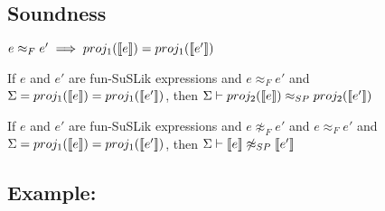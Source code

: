\documentclass[10pt]{article}
\begin{document}
%
%
%
%
%
%


\subsection{Soundness}
\label{sec:TransSoundness}


\begin{theorem}
  $e \approx_F e' \implies proj_1(\llbracket e\rrbracket) = proj_1(\llbracket e'\rrbracket)$
\end{theorem}

\begin{theorem}
  If $e$ and $e'$ are fun-SuSLik expressions and $e \approx_F e'$ and $\Sigma = proj_1(\llbracket e\rrbracket) = proj_1(\llbracket e'\rrbracket)$,
  then $\Sigma \vdash proj_2(\llbracket e\rrbracket) \approx_{SP} proj_2(\llbracket e'\rrbracket)$
\end{theorem}

\begin{theorem}[Adequacy]
  If $e$ and $e'$ are fun-SuSLik expressions and $e \not\approx_F e'$ and $e \approx_F e'$ and $\Sigma = proj_1(\llbracket e\rrbracket) = proj_1(\llbracket e'\rrbracket)$,
  then $\Sigma \vdash \llbracket e\rrbracket \not\approx_{SP} \llbracket e'\rrbracket$
\end{theorem}

\subsection{Example: }

%
\end{document}
